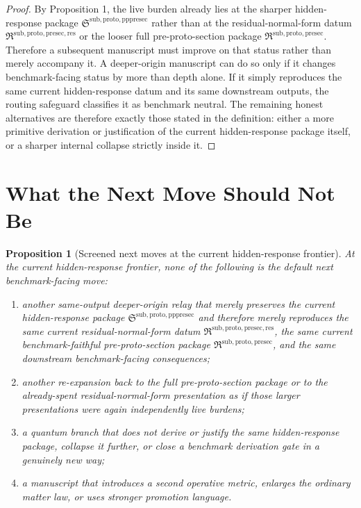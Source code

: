 \documentclass[11pt]{article}
\newcommand{\PreProtoSectionPackage}{\mathfrak R^{\mathrm{sub,proto,presec}}}
\newcommand{\PreProtoSectionResidualPackage}{\mathfrak R^{\mathrm{sub,proto,presec,res}}}
\newcommand{\PrePreProtoSectionPackage}{\mathfrak S^{\mathrm{sub,proto,pppresec}}}
\newtheorem{proposition}{Proposition}
\begin{document}
\begin{proof}
By Proposition 1, the live burden already lies at the sharper hidden-response package \(\PrePreProtoSectionPackage\) rather than at the residual-normal-form datum \(\PreProtoSectionResidualPackage\) or the looser full pre-proto-section package \(\PreProtoSectionPackage\). Therefore a subsequent manuscript must improve on that status rather than merely accompany it. A deeper-origin manuscript can do so only if it changes benchmark-facing status by more than depth alone. If it simply reproduces the same current hidden-response datum and its same downstream outputs, the routing safeguard classifies it as benchmark neutral. The remaining honest alternatives are therefore exactly those stated in the definition: either a more primitive derivation or justification of the current hidden-response package itself, or a sharper internal collapse strictly inside it.
\end{proof}

\section{What the Next Move Should Not Be}

\begin{proposition}[Screened next moves at the current hidden-response frontier]
At the current hidden-response frontier, none of the following is the default next benchmark-facing move:
\begin{enumerate}
    \item another same-output deeper-origin relay that merely preserves the current hidden-response package \(\PrePreProtoSectionPackage\) and therefore merely reproduces the same current residual-normal-form datum \(\PreProtoSectionResidualPackage\), the same current benchmark-faithful pre-proto-section package \(\PreProtoSectionPackage\), and the same downstream benchmark-facing consequences;
    \item another re-expansion back to the full pre-proto-section package or to the already-spent residual-normal-form presentation as if those larger presentations were again independently live burdens;
    \item a quantum branch that does not derive or justify the same hidden-response package, collapse it further, or close a benchmark derivation gate in a genuinely new way;
    \item a manuscript that introduces a second operative metric, enlarges the ordinary matter law, or uses stronger promotion language.
\end{enumerate}
\end{proposition}
\end{document}
